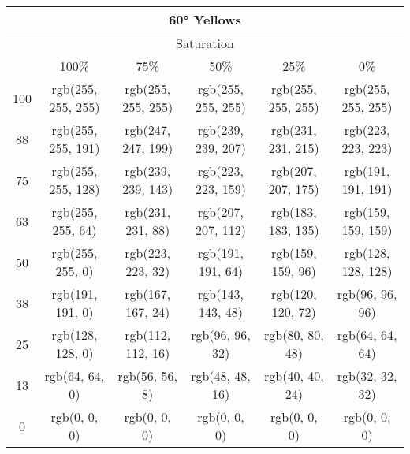 \documentclass[a4j]{jarticle}
\begin{document}
\begin{tabular}{|c|c|c|c|c|c|}
\multicolumn{6}{|c|}{60°
 Yellows}\\\hline\multicolumn{6}{|c|}{Saturation}\\\hline&100\%&75\%&50\%&25\%&0\%\\\hline100&rgb(255,
     255, 255)&rgb(255, 255, 255)&rgb(255, 255, 255)&rgb(255, 255,
                 255)&rgb(255, 255, 255)\\\hline88&rgb(255, 255,
     191)&rgb(247, 247, 199)&rgb(239, 239, 207)&rgb(231, 231,
                 215)&rgb(223, 223, 223)\\\hline75&rgb(255, 255,
     128)&rgb(239, 239, 143)&rgb(223, 223, 159)&rgb(207, 207,
                 175)&rgb(191, 191, 191)\\\hline63&rgb(255, 255,
     64)&rgb(231, 231, 88)&rgb(207, 207, 112)&rgb(183, 183,
                 135)&rgb(159, 159, 159)\\\hline50&rgb(255, 255,
     0)&rgb(223, 223, 32)&rgb(191, 191, 64)&rgb(159, 159, 96)&rgb(128,
                     128, 128)\\\hline38&rgb(191, 191, 0)&rgb(167, 167,
         24)&rgb(143, 143, 48)&rgb(120, 120, 72)&rgb(96, 96,
                     96)\\\hline25&rgb(128, 128, 0)&rgb(112, 112,
         16)&rgb(96, 96, 32)&rgb(80, 80, 48)&rgb(64, 64,
                     64)\\\hline13&rgb(64, 64, 0)&rgb(56, 56, 8)&rgb(48,
             48, 16)&rgb(40, 40, 24)&rgb(32, 32, 32)\\\hline0&rgb(0, 0,
     0)&rgb(0, 0, 0)&rgb(0, 0, 0)&rgb(0, 0, 0)&rgb(0, 0, 0) 
\end{tabular}
\end{document}

